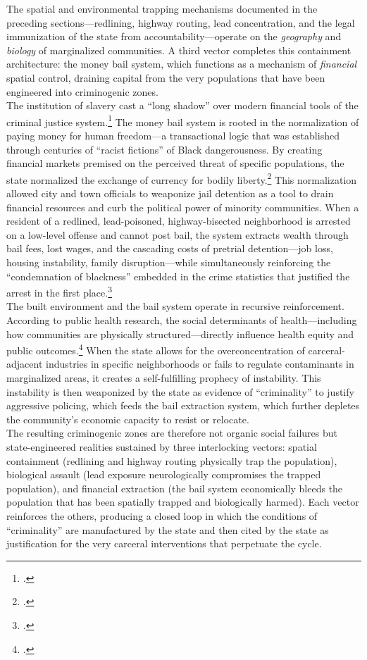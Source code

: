 \documentclass[
]{article}
\begin{document}
The spatial and environmental trapping mechanisms documented in the
preceding sections---redlining, highway routing, lead concentration,
and the legal immunization of the state from accountability---operate on
the \emph{geography} and \emph{biology} of marginalized communities. A
third vector completes this containment architecture: the money bail
system, which functions as a mechanism of \emph{financial} spatial
control, draining capital from the very populations that have been
engineered into criminogenic zones.\\
The institution of slavery cast a ``long shadow'' over modern financial
tools of the criminal justice system.\footcite{vera_bail_slavery} The
money bail system is rooted in the normalization of paying money for
human freedom---a transactional logic that was established through
centuries of ``racist fictions'' of Black dangerousness. By creating
financial markets premised on the perceived threat of specific
populations, the state normalized the exchange of currency for bodily
liberty.\footcite{vera_bail_slavery} This normalization allowed city and
town officials to weaponize jail detention as a tool to drain financial
resources and curb the political power of minority communities. When a
resident of a redlined, lead-poisoned, highway-bisected neighborhood is
arrested on a low-level offense and cannot post bail, the system
extracts wealth through bail fees, lost wages, and the cascading costs
of pretrial detention---job loss, housing instability, family
disruption---while simultaneously reinforcing the ``condemnation of
blackness'' embedded in the crime statistics that justified the arrest in
the first place.\footcite{vera_condemnation_blackness}\\
The built environment and the bail system operate in recursive
reinforcement. According to public health research, the social
determinants of health---including how communities are physically
structured---directly influence health equity and public
outcomes.\footcite{ncbi_social_determinants} When the state allows for
the overconcentration of carceral-adjacent industries in specific
neighborhoods or fails to regulate contaminants in marginalized areas,
it creates a self-fulfilling prophecy of instability. This instability
is then weaponized by the state as evidence of ``criminality'' to
justify aggressive policing, which feeds the bail extraction system,
which further depletes the community's economic capacity to resist or
relocate.\\
The resulting criminogenic zones are therefore not organic social
failures but state-engineered realities sustained by three interlocking
vectors: spatial containment (redlining and highway routing physically
trap the population), biological assault (lead exposure neurologically
compromises the trapped population), and financial extraction (the bail
system economically bleeds the population that has been spatially
trapped and biologically harmed). Each vector reinforces the others,
producing a closed loop in which the conditions of ``criminality'' are
manufactured by the state and then cited by the state as justification
for the very carceral interventions that perpetuate the cycle.
\end{document}
